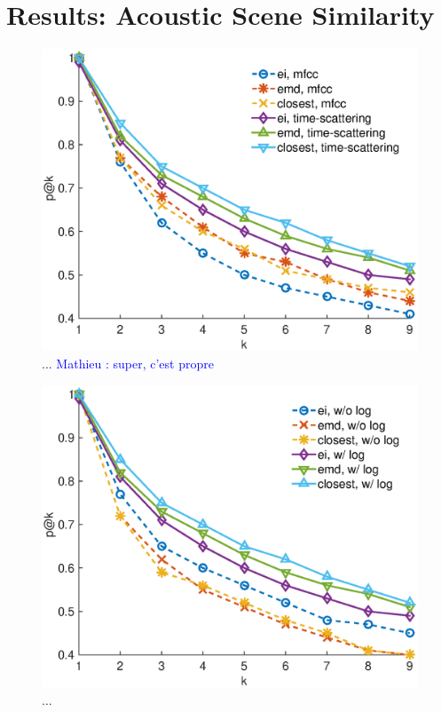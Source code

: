 \documentclass[journal]{IEEEtran}
\newcommand{\ml}[1]{\textcolor{blue}{ Mathieu : #1}}
\begin{document}
\section{Results: Acoustic Scene Similarity}

\begin{figure}
\begin{center}
\includegraphics[width=\columnwidth]{gfx/unsupervised_test1.eps}
\caption{... \ml{super, c'est propre}}
\end{center}
\end{figure}

\begin{figure}
\begin{center}
\includegraphics[width=\columnwidth]{gfx/unsupervised_test2.eps}
\caption{...}
\end{center}
\end{figure}
\end{document}
